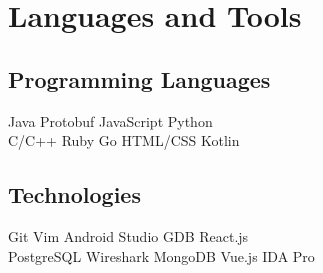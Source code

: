\documentclass[]{template}
\begin{document}
\section{Languages and Tools}
\begin{minipage}[t]{.45\textwidth}
\subsection{Programming Languages}
Java
\textbullet{} Protobuf
\textbullet{} JavaScript
\textbullet{} Python
\\ %
C/C++
\textbullet{} Ruby
\textbullet{} Go
\textbullet{} HTML/CSS
\textbullet{} Kotlin
\sectionsep
\end{minipage}
\hfill
\begin{minipage}[t]{.45\textwidth}
\subsection{Technologies}
Git
\textbullet{} Vim
\textbullet{} Android Studio
\textbullet{} GDB
\textbullet{} React.js
\\ %
PostgreSQL
\textbullet{} Wireshark
\textbullet{} MongoDB
\textbullet{} Vue.js
\textbullet{} IDA Pro
\end{minipage}
\end{document}
